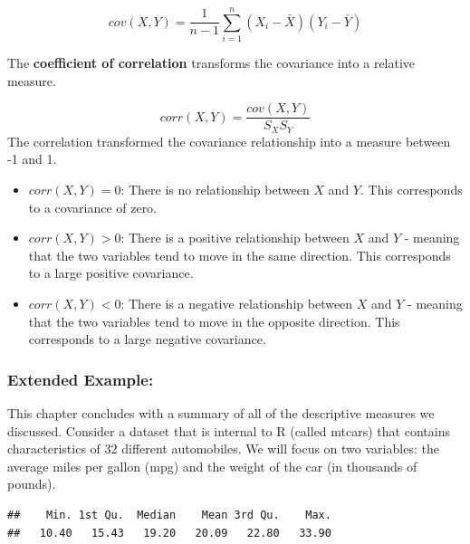 \documentclass[
]{book}
\newenvironment{Shaded}{\begin{snugshade}}{\end{snugshade}}
\newcommand{\CommentTok}[1]{\textcolor[rgb]{0.56,0.35,0.01}{\textit{#1}}}
\newcommand{\FunctionTok}[1]{\textcolor[rgb]{0.00,0.00,0.00}{#1}}
\newcommand{\NormalTok}[1]{#1}
\newcommand{\OtherTok}[1]{\textcolor[rgb]{0.56,0.35,0.01}{#1}}
\newcommand{\SpecialCharTok}[1]{\textcolor[rgb]{0.00,0.00,0.00}{#1}}
\begin{document}
\[cov(X,Y)=\frac{1}{n-1}\sum\limits_{i=1}^n(X_i-\bar{X})(Y_i-\bar{Y})\]

The \textbf{coefficient of correlation} transforms the covariance into a relative measure.

\[corr(X,Y)=\frac{cov(X,Y)}{S_{X}S_{Y}}\]
The correlation transformed the covariance relationship into a measure between -1 and 1.

\begin{itemize}
\item
  \(corr(X,Y)=0\): There is no relationship between \(X\) and \(Y\). This corresponds to a covariance of zero.
\item
  \(corr(X,Y)>0\): There is a positive relationship between \(X\) and \(Y\) - meaning that the two variables tend to move in the same direction. This corresponds to a large positive covariance.
\item
  \(corr(X,Y)<0\): There is a negative relationship between \(X\) and \(Y\) - meaning that the two variables tend to move in the opposite direction. This corresponds to a large negative covariance.
\end{itemize}

\hypertarget{extended-example}{%
\subsubsection*{Extended Example:}\label{extended-example}}

This chapter concludes with a summary of all of the descriptive measures we discussed. Consider a dataset that is internal to R (called mtcars) that contains characteristics of 32 different automobiles. We will focus on two variables: the average miles per gallon (mpg) and the weight of the car (in thousands of pounds).

\begin{Shaded}
\end{Shaded}

\begin{verbatim}
##    Min. 1st Qu.  Median    Mean 3rd Qu.    Max. 
##   10.40   15.43   19.20   20.09   22.80   33.90
\end{verbatim}
\end{document}
